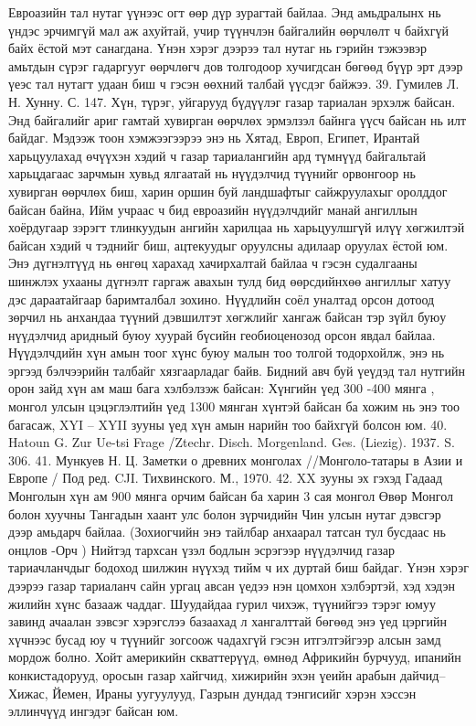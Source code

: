 Евроазийн тал нутаг үүнээс огт өөр дүр зурагтай байлаа. Энд амьдралынх нь үндэс эрчимгүй мал аж ахуйтай, учир түүнчлэн байгалийн өөрчлөлт ч байхгүй байх ёстой мэт санагдана. Үнэн хэрэг дээрээ тал нутаг нь гэрийн тэжээвэр амьтдын сүрэг гадаргууг өөрчлөгч дов толгодоор хучигдсан бөгөөд бүүр эрт дээр үеэс тал нутагт удаан биш ч гэсэн өөхний талбай үүсдэг байжээ. 39. Гумилев Л. Н. Хунну. С. 147.
Хүн, түрэг, уйгарууд бүдүүлэг газар тариалан эрхэлж байсан. Энд байгалийг ариг гамтай хувирган өөрчлөх эрмэлзэл байнга үүсч байсан нь илт байдаг. Мэдээж тоон хэмжээгээрээ энэ нь Хятад, Европ, Египет, Ирантай харьцуулахад өчүүхэн хэдий ч газар тариалангийн ард түмнүүд байгальтай харьцдагаас зарчмын хувьд ялгаатай нь нүүдэлчид түүнийг орвонгоор нь хувирган өөрчлөх биш, харин оршин буй ландшафтыг сайжруулахыг оролддог байсан байна, Ийм учраас ч бид евроазийн нүүдэлчдийг манай ангиллын хоёрдугаар зэрэгт тлинкуудын ангийн харилцаа нь харьцуулшгүй илүү хөгжилтэй байсан хэдий ч тэднийг биш, ацтекуудыг оруулсны адилаар оруулах ёстой юм. Энэ дүгнэлтүүд нь өнгөц харахад хачирхалтай байлаа ч гэсэн судалгааны шинжлэх ухааны дүгнэлт гаргаж авахын тулд бид өөрсдийнхөө ангиллыг хатуу дэс дараатайгаар баримталбал зохино.
Нүүдлийн соёл уналтад орсон дотоод зөрчил нь анхандаа түүний дэвшилтэт хөгжлийг хангаж байсан тэр зүйл буюу нүүдэлчид аридный буюу хуурай бүсийн геобиоценозод орсон явдал байлаа. Нүүдэлчдийн хүн амын тоог хүнс буюу малын тоо толгой тодорхойлж, энэ нь эргээд бэлчээрийн талбайг хязгаарладаг байв. Бидний авч буй үеүдэд тал нутгийн орон зайд хүн ам маш бага хэлбэлзэж байсан: Хүнгийн үед 300 -400 мянга , монгол улсын цэцэглэлтийн үед 1300 мянган хүнтэй байсан ба хожим нь энэ тоо багасаж, XYI – XYII зууны үед хүн амын нарийн тоо байхгүй болсон юм. 40. Hatoun G. Zur Ue-tsi Frage /Ztechr. Disch. Morgenland. Ges. (Liezig). 1937. S. 306. 41. Мункуев Н. Ц. Заметки о древних монголах //Монголо-татары в Азии и Европе / Под ред. CJI. Тихвинского. М., 1970.
42. XX зууны эх гэхэд Гадаад Монголын хүн ам 900 мянга орчим байсан ба харин 3 сая монгол Өвөр Монгол болон хуучны Тангадын хаант улс болон зүрчидийн Чин улсын нутаг дэвсгэр дээр амьдарч байлаа. (Зохиогчийн энэ тайлбар анхаарал татсан тул бусдаас нь онцлов -Орч )
Нийтэд тархсан үзэл бодлын эсрэгээр нүүдэлчид газар тариачланчдыг бодоход шилжин нүүхэд тийм ч их дуртай биш байдаг. Үнэн хэрэг дээрээ газар тариаланч сайн ургац авсан үедээ нэн цомхон хэлбэртэй, хэд хэдэн жилийн хүнс базааж чаддаг. Шуудайдаа гурил чихэж, түүнийгээ тэрэг юмуу завинд ачаалан зэвсэг хэрэгслээ базаахад л хангалттай бөгөөд энэ үед цэргийн хүчнээс бусад юу ч түүнийг зогсоож чадахгүй гэсэн итгэлтэйгээр алсын замд мордож болно. Хойт америкийн скваттерүүд, өмнөд Африкийн бурчууд, ипанийн конкистадорууд, оросын газар хайгчид, хижирийн эхэн үеийн арабын дайчид–Хижас, Йемен, Ираны уугуулууд, Газрын дундад тэнгисийг хэрэн хэссэн эллинчүүд ингэдэг байсан юм.
